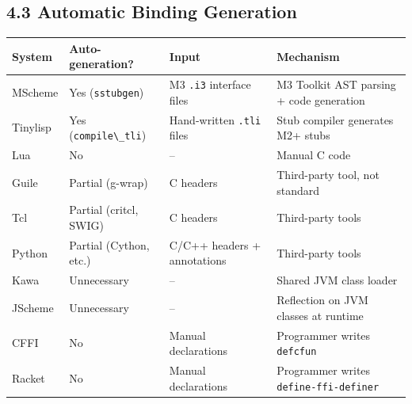 \documentclass[
  12pt,
]{report}
\newcommand{\passthrough}[1]{#1}
\newcounter{none} %
\begin{document}
\subsection{4.3 Automatic Binding
Generation}\label{automatic-binding-generation}

{\def\LTcaptype{none} %
\begin{longtable}[]{@{}
  >{\raggedright\arraybackslash}p{}
  >{\raggedright\arraybackslash}p{}
  >{\raggedright\arraybackslash}p{}
  >{\raggedright\arraybackslash}p{}@{}}
\toprule\noalign{}
\begin{minipage}[b]{\linewidth}\raggedright
System
\end{minipage} & \begin{minipage}[b]{\linewidth}\raggedright
Auto-generation?
\end{minipage} & \begin{minipage}[b]{\linewidth}\raggedright
Input
\end{minipage} & \begin{minipage}[b]{\linewidth}\raggedright
Mechanism
\end{minipage} \\
\midrule\noalign{}
\endhead
\bottomrule\noalign{}
\endlastfoot
MScheme & Yes (\passthrough{\lstinline!sstubgen!}) & M3
\passthrough{\lstinline!.i3!} interface files & M3 Toolkit AST parsing +
code generation \\
Tinylisp & Yes (\passthrough{\lstinline!compile\_tli!}) & Hand-written
\passthrough{\lstinline!.tli!} files & Stub compiler generates M2+
stubs \\
Lua & No & -- & Manual C code \\
Guile & Partial (g-wrap) & C headers & Third-party tool, not standard \\
Tcl & Partial (critcl, SWIG) & C headers & Third-party tools \\
Python & Partial (Cython, etc.) & C/C++ headers + annotations &
Third-party tools \\
Kawa & Unnecessary & -- & Shared JVM class loader \\
JScheme & Unnecessary & -- & Reflection on JVM classes at runtime \\
CFFI & No & Manual declarations & Programmer writes
\passthrough{\lstinline!defcfun!} \\
Racket & No & Manual declarations & Programmer writes
\passthrough{\lstinline!define-ffi-definer!} \\
\end{longtable}
}
\end{document}
